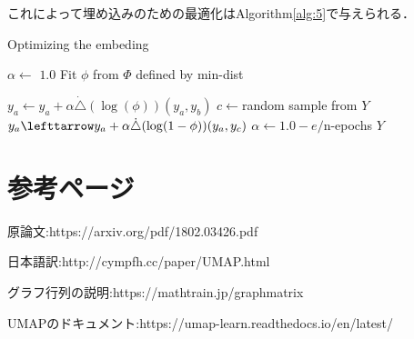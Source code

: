 \documentclass{jsarticle}
\begin{document}
これによって埋め込みのための最適化はAlgorithm\ref{alg:5}で与えられる．

\begin{algorithm}
  \caption{Optimizing the embeding}
  \label{alg:5}
  \begin{algorithmic}
    \State $\alpha \leftarrow$ $1.0$
    \State Fit $\phi$ from $\Phi$ defined by min-dist


          \State $y_a \leftarrow y_a + \alpha \dot \triangle(\log (\phi))(y_a,y_b)$
            \State $c \leftarrow $random sample from $Y$
            \State $y_a \lefttarrow y_a + \alpha \dot \triangle(\log (1-\phi))(y_a,y_c)$
          \EndFor
        \EndIf
      \State $\alpha \leftarrow 1.0 - e /$n-epochs
      \EndFor
    \EndFor
    \State \Return $Y$
  \end{algorithmic}
\end{algorithm}







\section*{参考ページ}
原論文:https://arxiv.org/pdf/1802.03426.pdf

日本語訳:http://cympfh.cc/paper/UMAP.html

グラフ行列の説明:https://mathtrain.jp/graphmatrix

UMAPのドキュメント:https://umap-learn.readthedocs.io/en/latest/
\end{document}

